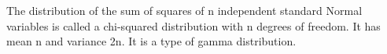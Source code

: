 The distribution of the sum of squares of n independent standard
Normal variables is called a chi-squared distribution 
with n degrees of freedom. It has mean n and variance 2n.
It is a type of gamma distribution.